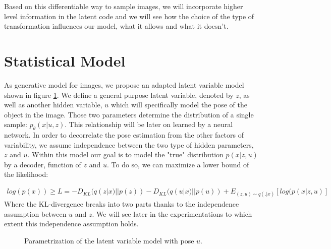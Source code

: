 \documentclass[letterpaper, twoside]{article}
\begin{document}
    Based on this differentiable way to sample images, we will incorporate higher level information in the latent code and we will see how the choice of the type of transformation influences our model, what it allows and what it doesn't.

\section{Statistical Model}
    As generative model for images, we propose an adapted latent variable model shown in figure \ref{tvaegraphmodel}. We define a general purpose latent variable, denoted by $z$, as well as another hidden variable, $u$ which will specifically model the pose of the object in the image. Those two parameters determine the distribution of a single sample: $p_\theta(x|u,z)$. This relationship will be later on learned by a neural network. In order to decorrelate the pose estimation from the other factors of variability, we assume independence between the two type of hidden parameters, $z$ and $u$.
    Within this model our goal is to model the "true" distribution $p(x|z,u)$ by a decoder, function of $z$ and $u$. To do so, we can maximize a lower bound of the likelihood:

\begin{align}
log(p(x)) \geq L = - D_{KL}(q(z|x)||p(z)) - D_{KL}(q(u|x)||p(u)) + E_{(z, u)\sim q(.|x)}[log(p(x| z, u)]
\end{align}
 Where the KL-divergence breaks into two parts thanks to the independence assumption between $u$ and $z$. We will see later in the experimentations to which extent this independence assumption holds.


    \begin{figure}[h]
    \centering
    \caption{Parametrization of the latent variable model with pose $u$.}
    \label{tvaegraphmodel}
    \end{figure}
\end{document}
